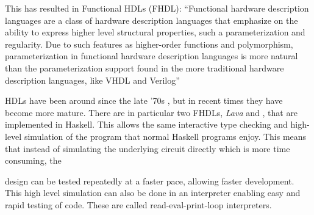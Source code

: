		This has resulted in Functional HDLs (FHDL): ``Functional hardware
		description languages are a class of hardware description languages
		that emphasize on the ability to express higher level structural
		properties, such a parameterization and regularity. Due to such
		features as higher-order functions and polymorphism, parameterization
		in functional hardware description languages is more natural than the
		parameterization support found in the more traditional hardware
		description languages, like VHDL and Verilog'' \cite{Baaij2009}
		
		HDLs have been around since the late '70s \cite{Chen2012},
		but in recent times they have become more mature\cite{TODO}. There are in
		particular two FHDLs, \emph{Lava} and \clash \cite{Baaij2009,
		Bjesse1998}, that are implemented in Haskell. This allows the same
		interactive type checking and high-level simulation of the program that
		normal Haskell programs enjoy. This means that instead of simulating
		the underlying circuit directly which is more time consuming, the

		design can be tested repeatedly at a faster pace, allowing faster 
		development. This high level simulation can also be done in an interpreter enabling easy and 			rapid testing of code. These are called read-eval-print-loop interpreters.

